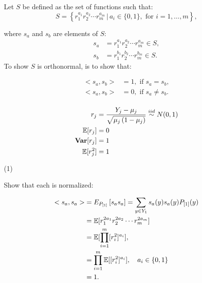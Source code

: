 \documentclass[UTF8,a4paper,10pt]{article}
\begin{document}
Let \(S\) be defined as the set of functions such that:
\[
S=\left\{r_1^{a_1} r_2^{a_2} \cdots r_m^{a_m} \,|\,a_i \in \{0,1\}, \text{ for } i = 1, \ldots, m\right\},
\]

where \(s_a\) and \(s_b\) are elements of \(S\):
\[
\begin{aligned}
s_a &= r_1^{a_1} r_2^{a_2} \cdots r_m^{a_m} \in S, \\
s_b &= r_1^{b_1} r_2^{b_2} \cdots r_m^{b_m} \in S.
\end{aligned}
\]
 To show \(S\) is orthonormal, is to show that:

\begin{equation*}
  \begin{aligned}
    <s_a,s_b> &= 1, \text{ if } s_a = s_b,\\
    <s_a,s_b> &= 0, \text{ if } s_a \neq s_b.\\
  \end{aligned}
\end{equation*}



\dotfill

\begin{mybox}{}

  \begin{equation*}
    \begin{aligned}
      r_j&=\frac{Y_j-\mu_j}{\sqrt{\mu_j\left(1-\mu_j\right)}}\overset{iid}{\sim} N(0,1)\\
      \operatorname{\mathbb{E}}[r_j] &= 0\\
      \operatorname{\textbf{Var}}[r_j] &= 1\\
      \operatorname{\mathbb{E}}[r_j^2] &= 1\\
    \end{aligned}
  \end{equation*}
  \end{mybox}

(1)

Show that each is normalized:

\begin{equation*}
  \begin{aligned}
    <s_a,s_a> &=  E_{P_{[1]}}\left[s_a s_a\right]=\sum_{y \in Y_1} s_a(y) s_a(y) P_{[1]}(y)\\
    &=\operatorname{\mathbb{E}}[r_1^{2a_1} r_2^{2a_2} \cdots r_m^{2a_m}]\\
    &= \operatorname{\mathbb{E}}[\prod_{i = 1}^{m} [r_i^2]^{a_i}], \\
    &= \prod_{i = 1}^{m}\operatorname{\mathbb{E}}[ [r_i^2]^{a_i}], \quad a_i\in \{0,1\}\\
    &= 1.
  \end{aligned}
\end{equation*}
\end{document}
